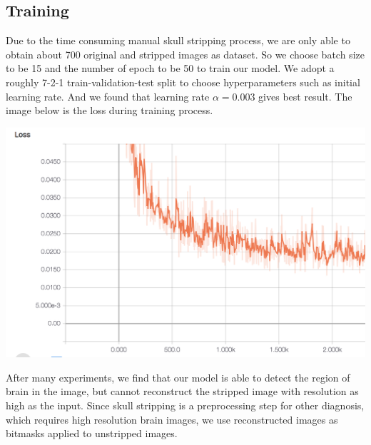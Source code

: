 \documentclass[conference]{IEEEtran}
\begin{document}
\subsection*{Training}
Due to the time consuming manual skull stripping process, we are only able to obtain about 700 original and stripped images as dataset. So we choose batch size to be 15 and the number of epoch to be 50 to train our model. We adopt a roughly 7-2-1 train-validation-test split to choose hyperparameters such as initial learning rate. And we found that learning rate $\alpha = 0.003$ gives best result. The image below is the loss during training process.\\
\begin{center}
    \includegraphics[scale=0.2]{loss.png}  
\end{center}

After many experiments, we find that our model is able to detect the region of brain in the image, but cannot reconstruct the stripped image with resolution as high as the input. Since skull stripping is a preprocessing step for other diagnosis, which requires high resolution brain images, we use reconstructed images as bitmasks applied to unstripped images.
\end{document}
